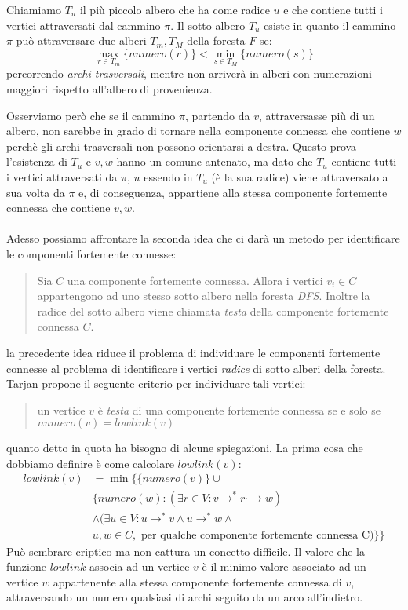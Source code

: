 Chiamiamo $T_{u}$ il pi\`u piccolo albero che ha come radice $u$ e che
contiene tutti i vertici attraversati dal cammino $\pi$. Il sotto
albero $T_{u}$ esiste in quanto il cammino $\pi$ pu\`o attraversare
due alberi $T_{m}, T_{M}$ della foresta $F$ se:
\begin{displaymath}
  \max_{r \in T_{m}}\{numero(r)\} < \min_{s \in T_{M}}\{numero(s)\}
\end{displaymath}
percorrendo \emph{archi trasversali}, mentre non arriver\`a in alberi
con numerazioni maggiori rispetto all'albero di provenienza.

Osserviamo per\`o che se il cammino $\pi$, partendo da $v$,
attraversasse pi\`u di un albero, non sarebbe in grado di tornare
nella componente connessa che contiene $w$ perch\`e gli archi
trasversali non possono orientarsi a destra. Questo prova l'esistenza
di $T_{u}$ e $v,w$ hanno un comune antenato, ma dato che $T_{u}$
contiene tutti i vertici attraversati da $\pi$, $u$ essendo in $T_{u}$
(\`e la sua radice) viene attraversato a sua volta da $\pi$ e, di
conseguenza, appartiene alla stessa componente fortemente connessa che
contiene $v, w$.
\\\\
Adesso possiamo affrontare la seconda idea che ci dar\`a un metodo per
identificare le componenti fortemente connesse:
\begin{quotation}
  Sia $C$ una componente fortemente connessa. Allora i vertici $v_{i}
  \in C$ appartengono ad uno stesso sotto albero nella foresta
  \emph{DFS}. Inoltre la radice del sotto albero viene chiamata
  \emph{testa} della componente fortemente connessa $C$.
\end{quotation}
la precedente idea riduce il problema di individuare le componenti
fortemente connesse al problema di identificare i vertici
\emph{radice} di sotto alberi della foresta. Tarjan propone il
seguente criterio per individuare tali vertici:
\begin{quotation}
  un vertice $v$ \`e \emph{testa} di una componente fortemente
  connessa se e solo se $numero(v) = lowlink(v)$
\end{quotation}
quanto detto in quota ha bisogno di alcune spiegazioni. La prima cosa
che dobbiamo definire \`e come calcolare $lowlink(v)$:
\begin{displaymath}
  \begin{split}
    lowlink(v) &= \min \{ \{numero(v)\} \cup \\
      & \{numero(w): (\exists r \in V: v \rightarrow^{*} r
      \cdot\rightarrow w) \\
      & \wedge (\exists u \in V: u \rightarrow^{*} v \wedge u
      \rightarrow^{*} w \wedge \\
      & u,w \in C, \text{ per qualche componente fortemente connessa
        C}) \}\}
  \end{split}
\end{displaymath}
Pu\`o sembrare criptico ma non cattura un concetto difficile. Il
valore che la funzione $lowlink$ associa ad un vertice $v$ \`e il
minimo valore associato ad un vertice $w$ appartenente alla stessa
componente fortemente connessa di $v$, attraversando un numero
qualsiasi di archi seguito da un arco all'indietro.

